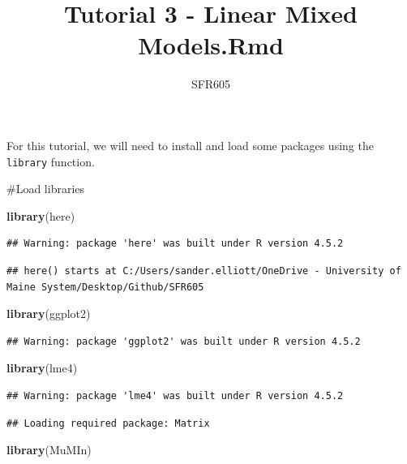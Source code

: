 \documentclass[
]{article}
\title{Tutorial 3 - Linear Mixed Models.Rmd}
\author{SFR605}
\date{}
\newenvironment{Shaded}{\begin{snugshade}}{\end{snugshade}}
\newcommand{\FunctionTok}[1]{\textcolor[rgb]{0.13,0.29,0.53}{\textbf{#1}}}
\newcommand{\NormalTok}[1]{#1}
\begin{document}
\maketitle

For this tutorial, we will need to install and load some packages using
the \texttt{library} function.

\#Load libraries

\begin{Shaded}
\begin{Highlighting}[]
 \FunctionTok{library}\NormalTok{(here)}
\end{Highlighting}
\end{Shaded}

\begin{verbatim}
## Warning: package 'here' was built under R version 4.5.2
\end{verbatim}

\begin{verbatim}
## here() starts at C:/Users/sander.elliott/OneDrive - University of Maine System/Desktop/Github/SFR605
\end{verbatim}

\begin{Shaded}
\begin{Highlighting}[]
 \FunctionTok{library}\NormalTok{(ggplot2)}
\end{Highlighting}
\end{Shaded}

\begin{verbatim}
## Warning: package 'ggplot2' was built under R version 4.5.2
\end{verbatim}

\begin{Shaded}
\begin{Highlighting}[]
 \FunctionTok{library}\NormalTok{(lme4)}
\end{Highlighting}
\end{Shaded}

\begin{verbatim}
## Warning: package 'lme4' was built under R version 4.5.2
\end{verbatim}

\begin{verbatim}
## Loading required package: Matrix
\end{verbatim}

\begin{Shaded}
\begin{Highlighting}[]
 \FunctionTok{library}\NormalTok{(MuMIn)}
\end{Highlighting}
\end{Shaded}
\end{document}
